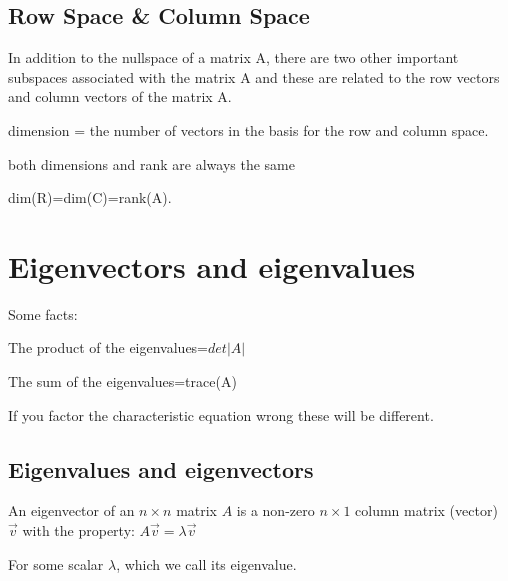 \documentclass{extarticle}
\begin{document}
\begin{multicols}{2}
\begin{tcolorbox}[enhanced jigsaw,sharp corners,coltext=black,colback=BurntOrange!25!white,boxrule=0pt,breakable,size=minimal]
\end{tcolorbox}

\begin{tcolorbox}[enhanced jigsaw,sharp corners,coltext=black,colback=BurntOrange!25!white,boxrule=0pt,breakable,size=minimal]

\subsection{Row Space \& Column Space}
In addition to the nullspace of a matrix A, there are two other important subspaces associated with the matrix A and these are related to the row vectors and column vectors of the matrix A.



dimension = the number of vectors in the basis for the row and column space.

both dimensions and rank are always the same

dim(R)=dim(C)=rank(A).\end{tcolorbox}

























\section{Eigenvectors and eigenvalues}
Some facts:

	The product of the eigenvalues=$det|A|$
	
	The sum of the eigenvalues=trace(A)
	
If you factor the characteristic equation wrong these will be different.


\subsection{Eigenvalues and eigenvectors}

An eigenvector of an $n\times n$ matrix $A$ is a non-zero $n\times 1$ column matrix (vector) $\vec{v}$ with the property:
$A\vec{v}=\lambda\vec{v}$

For some scalar $\lambda$, which we call its eigenvalue.


\end{multicols}
\end{document}
